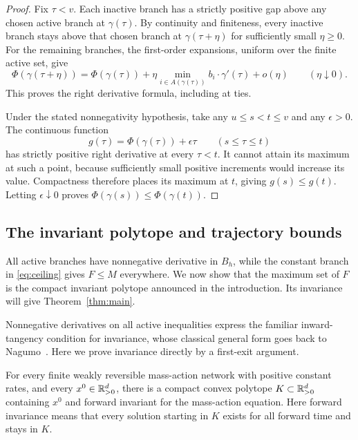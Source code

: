 \begin{proof}
Fix $\tau<v$. Each inactive branch has a strictly positive gap above
any chosen active branch at $\gamma(\tau)$. By continuity and finiteness,
every inactive branch stays above that chosen branch at
$\gamma(\tau+\eta)$ for sufficiently small $\eta\ge0$. For the remaining
branches, the first-order expansions, uniform over the finite active set,
give
\[
 \Phi(\gamma(\tau+\eta))
 =\Phi(\gamma(\tau))
  +\eta\min_{i\in A(\gamma(\tau))}
       b_i\cdot\gamma'(\tau)+o(\eta)
 \qquad(\eta\downarrow0).
\]
This proves the right derivative formula, including at ties.

Under the stated nonnegativity hypothesis, take any
$u\le s<t\le v$ and any $\epsilon>0$. The continuous function
\[
 g(\tau)=\Phi(\gamma(\tau))+\epsilon\tau
 \qquad(s\le\tau\le t)
\]
has strictly positive right derivative at every $\tau<t$. It cannot
attain its maximum at such a point, because sufficiently small positive
increments would increase its value. Compactness therefore places its
maximum at $t$, giving $g(s)\le g(t)$. Letting $\epsilon\downarrow0$
proves $\Phi(\gamma(s))\le\Phi(\gamma(t))$.
\end{proof}

\subsection{The invariant polytope and trajectory bounds}

All active branches have nonnegative derivative in $B_h$, while the
constant branch in \eqref{eq:ceiling} gives $F\le M$ everywhere. We now
show that the maximum set of $F$ is the compact invariant polytope
announced in the introduction. Its invariance will give
Theorem~\ref{thm:main}.

Nonnegative derivatives on all active inequalities express the familiar
inward-tangency condition for invariance, whose classical general form
goes back to Nagumo~\cite{Nagumo1942}. Here we prove invariance directly
by a first-exit argument.

\begin{proposition}\label{prop:polytope}
For every finite weakly reversible mass-action network with positive
constant rates, and every $x^0\in\mathbb R_{>0}^d$, there is a compact convex
polytope $K\subset\mathbb R_{>0}^d$ containing $x^0$ and forward invariant for
the mass-action equation. Here forward invariance means that every
solution starting in $K$ exists for all forward time and stays in $K$.
\end{proposition}


